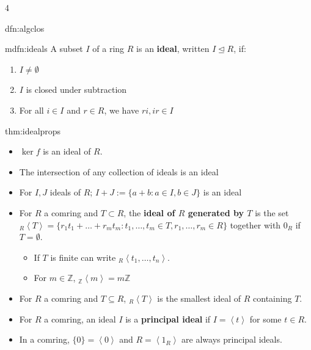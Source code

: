 \documentclass[landscape, 8pt]{extarticle}
\begin{document}
\begin{multicols*}{4}
\begin{dfn}{dfn:algclos}{ }
		\end{dfn}
		
		
		\begin{mdfn}[Ideals]{mdfn:ideals}{ }
			A subset $I$ of a ring $R$ is an \textbf{ideal}, written $I \trianglelefteq R$, if:
			\begin{enumerate}[label=(\arabic*)]
				\item $I \ne \emptyset$
				\item $I$ is closed under subtraction
				\item For all $i\in I$ and $r\in R$, we have $ri, ir\in I$
			\end{enumerate}
			
		\end{mdfn}
		
		
		\begin{thm}{thm:idealprops}{ }
			
			\begin{itemize}
				\item $\ker f$ is an ideal of $R$.
				\item The intersection of any collection of ideals is an ideal
				\item For $I, J$ ideals of $R$; $I + J := \{a + b : a \in I, b \in J\}$ is an ideal
				\item For $R$ a comring and $T \subset R$, the \textbf{ideal of $R$ generated by $T$} is the set $_R \left\langle T\right\rangle = \{r_1t_1 + \dots + r_mt_m: t_1, \dots, t_m \in T, r_1, \dots, r_m \in R\}$ together with $0_R$ if $T = \emptyset$.
					\begin{itemize}
						\item If $T$ is finite can write $_R \left\langle t_1, \dots, t_n\right\rangle$.
						\item For $m\in \mathbb{Z}$, $_{\mathbb{Z}}\left\langle m\right\rangle = m\mathbb{Z}$
					\end{itemize}
				\item For $R$ a comring and $T \subseteq R$, $_R \left\langle T\right\rangle$ is the smallest ideal of $R$ containing $T$.
				\item For $R$ a comring, an ideal $I$ is a \textbf{principal ideal} if $I = \left\langle t\right\rangle$ for some $t \in R$. 
				\item In a comring, $\{0\} = \left\langle 0\right\rangle$ and $R = \left\langle 1_R\right\rangle$ are always principal ideals.
			\end{itemize}
			
		\end{thm}
		

\end{multicols*}
\end{document}
